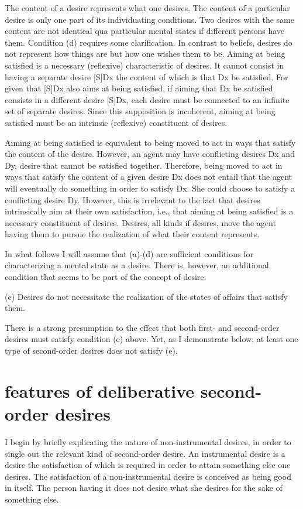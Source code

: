 \documentclass[output=paper,colorlinks,citecolor=brown
]{langscibook}
\begin{document}
The content of a desire represents what one desires. The content of a particular desire is only one part of its individuating conditions. Two desires with the same content are not identical qua particular mental states if different persons have them. 
Condition (d) requires some clarification. In contrast to beliefs, desires do not represent how things are but how one wishes them to be. Aiming at being satisfied is a necessary (reflexive) characteristic of desires. It cannot consist in having a separate desire [S]Dx the content of which is that Dx be satisfied. For given that [S]Dx also aims at being satisfied, if aiming that Dx be satisfied consists in a different desire [S]Dx, each desire must be connected to an infinite set of separate desires. Since this supposition is incoherent, aiming at being satisfied must be an intrinsic (reflexive) constituent of desires. 

	Aiming at being satisfied is equivalent to being moved to act in ways that satisfy the content of the desire. However, an agent may have conflicting desires Dx and Dy, desire that cannot be satisfied together. Therefore, being moved to act in ways that satisfy the content of a given desire Dx does not entail that the agent will eventually do something in order to satisfy Dx. She could choose to satisfy a conflicting desire Dy. However, this is irrelevant to the fact that desires intrinsically aim at their own satisfaction, i.e., that aiming at being satisfied is a necessary constituent of desires. Desires, all kinds if desires, move the agent having them to pursue the realization of what their content represents.
	
In what follows I will assume that (a)-(d) are sufficient conditions for characterizing a mental state as a desire. There is, however, an additional condition that seems to be part of the concept of desire:


(e)	Desires do not necessitate the realization of the states of affairs that satisfy them.


There is a strong presumption to the effect that both first- and second-order desires must satisfy condition (e) above. Yet, as I demonstrate below, at least one type of second-order desires does not satisfy (e). 

\section{features of deliberative second-order desires}

I begin by briefly explicating the nature of non-instrumental desires, in order to single out the relevant kind of second-order desire. 
An instrumental desire is a desire the satisfaction of which is required in order to attain something else one desires. The satisfaction of a non-instrumental desire is conceived as being good in itself. The person having it does not desire what she desires for the sake of something else.
\end{document}
